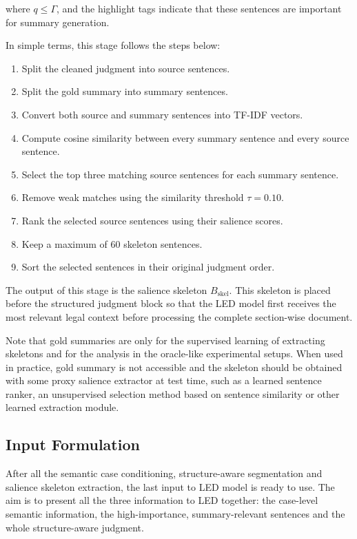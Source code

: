 \documentclass[11pt, a4paper]{article}
\theoremstyle{plain}%
\theoremstyle{remark}%
\theoremstyle{definition}%
\begin{document}
where \(q \leq \Gamma\), and the highlight tags indicate that these sentences are important for summary generation.

In simple terms, this stage follows the steps below:

\begin{enumerate}
    \item Split the cleaned judgment into source sentences.
    \item Split the gold summary into summary sentences.
    \item Convert both source and summary sentences into TF-IDF vectors.
    \item Compute cosine similarity between every summary sentence and every source sentence.
    \item Select the top three matching source sentences for each summary sentence.
    \item Remove weak matches using the similarity threshold \(\tau = 0.10\).
    \item Rank the selected source sentences using their salience scores.
    \item Keep a maximum of 60 skeleton sentences.
    \item Sort the selected sentences in their original judgment order.
\end{enumerate}

The output of this stage is the salience skeleton $B_{\text{skel}}$. This skeleton is placed before the structured judgment block so that the LED model first receives the most relevant legal context before processing the complete section-wise document.

Note that gold summaries are only for the supervised learning of extracting skeletons and for the analysis in the oracle-like experimental setups. When used in practice, gold summary is not accessible and the skeleton should be obtained with some proxy salience extractor at test time, such as a learned sentence ranker, an unsupervised selection method based on sentence similarity or other learned extraction module.

\subsection{Input Formulation}
After all the semantic case conditioning, structure-aware segmentation and salience skeleton extraction, the last input to LED model is ready to use. The aim is to present all the three information to LED together: the case-level semantic information, the high-importance, summary-relevant sentences and the whole structure-aware judgment.
\end{document}
